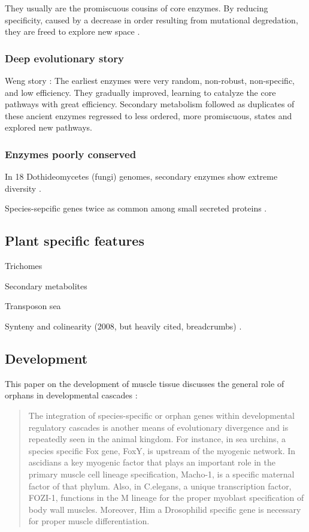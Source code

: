     They usually are the promiscuous cousins of core enzymes. By reducing
    specificity, caused by a decrease in order resulting from mutational
    degredation, they are freed to explore new space \cite[review]{weng_rise_2012}.

\subsubsection{Deep evolutionary story}

    Weng story \cite{weng_rise_2012}: The earliest enzymes were very random,
    non-robust, non-specific, and low efficiency. They gradually improved,
    learning to catalyze the core pathways with great efficiency. Secondary
    metabolism followed as duplicates of these ancient enzymes regressed to
    less ordered, more promiscuous, states and explored new pathways.

\subsubsection{Enzymes poorly conserved}

    In 18 Dothideomycetes (fungi) genomes, secondary enzymes show extreme
    diversity \cite{ohm_diverse_2012}.

    Species-sepcific genes twice as common among small secreted proteins
    \cite{ohm_diverse_2012}. 

\subsection{Plant specific features}

    Trichomes

    Secondary metabolites

    Transposon sea

    Synteny and colinearity (2008, but heavily cited, breadcrumbs)
    \cite{tang_synteny_2008}.

\subsection{Development}

  This paper on the development of muscle tissue discusses the general role of
  orphans in developmental cascades \cite{andrikou_too_2015}:

  \begin{quote}
    The integration of species-specific or orphan genes within developmental
    regulatory cascades is another means of evolutionary divergence and is
    repeatedly seen in the animal kingdom. For instance, in sea urchins, a
    species specific Fox gene, FoxY, is upstream of the myogenic network. In
    ascidians a key myogenic factor that plays an important role in the primary
    muscle cell lineage specification, Macho-1, is a specific maternal factor of
    that phylum. Also, in C.elegans, a unique transcription factor, FOZI-1,
    functions in the M lineage for the proper myoblast specification of body wall
    muscles. Moreover, Him a Drosophilid specific gene is necessary for proper
    muscle differentiation.
  \end{quote}
